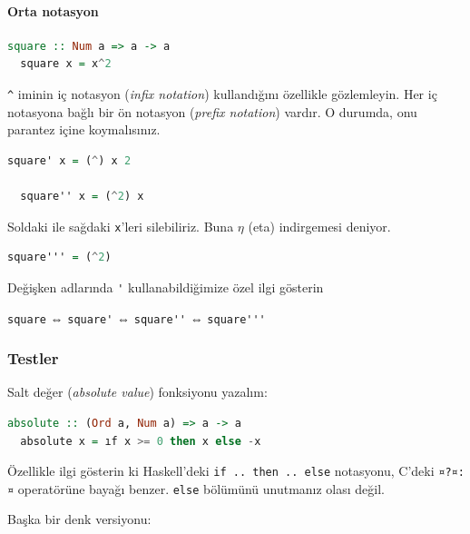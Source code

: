 \documentclass[a4paper,14pt,openany]{extbook} %
\let\oldparagraph\paragraph
\renewcommand{\paragraph}[1]{\oldparagraph{#1}\mbox{}}
\let\emph\textit
\begin{document}
\paragraph{Orta notasyon}\label{orta-notasyon}

\begin{lstlisting}[language=Haskell]
  square :: Num a => a -> a
  square x = x^2
\end{lstlisting}

\lstinline!^! iminin iç notasyon (\emph{infix notation}) kullandığını özellikle gözlemleyin. Her iç notasyona bağlı bir ön notasyon (\emph{prefix notation}) vardır. O durumda, onu parantez içine koymalısınız.

\begin{lstlisting}[language=Haskell]
  square' x = (^) x 2

  square'' x = (^2) x
\end{lstlisting}

Soldaki ile sağdaki \lstinline!x!'leri silebiliriz. Buna $η$ (eta)
indirgemesi %
deniyor.

\begin{lstlisting}[language=Haskell]
  square''' = (^2)
\end{lstlisting}

Değişken adlarında \lstinline!'! kullanabildiğimize özel ilgi gösterin

\lstinline!square! ⇔ \lstinline!square'! ⇔ \lstinline!square''! ⇔
\lstinline!square'''!

\subsubsection{Testler}\label{testler}

Salt değer (\emph{absolute value}) %
fonksiyonu yazalım:

\begin{lstlisting}[language=Haskell]
  absolute :: (Ord a, Num a) => a -> a
  absolute x = ıf x >= 0 then x else -x
\end{lstlisting}

Özellikle ilgi gösterin  ki Haskell'deki \lstinline!if .. then .. else! notasyonu,
C'deki \lstinline!¤?¤:¤! operatörüne bayağı benzer. \lstinline!else!
bölümünü unutmanız olası değil.

Başka bir denk versiyonu:
\end{document}
